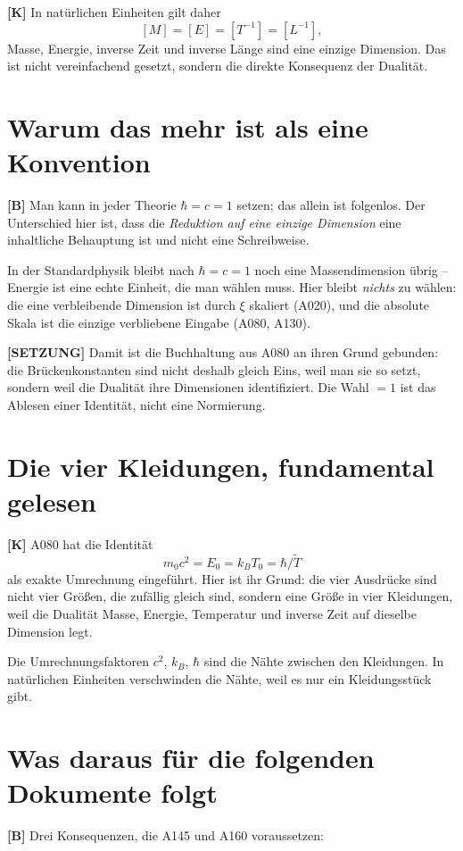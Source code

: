 \textbf{[K]} In natürlichen Einheiten gilt daher
\[
  [M] = [E] = [T^{-1}] = [L^{-1}],
\]
Masse, Energie, inverse Zeit und inverse Länge sind eine einzige Dimension. Das
ist nicht vereinfachend gesetzt, sondern die direkte Konsequenz der Dualität.

\section{Warum das mehr ist als eine Konvention}

\textbf{[B]} Man kann in jeder Theorie $\hbar = c = 1$ setzen; das allein ist
folgenlos. Der Unterschied hier ist, dass die \emph{Reduktion auf eine einzige
Dimension} eine inhaltliche Behauptung ist und nicht eine Schreibweise.

In der Standardphysik bleibt nach $\hbar = c = 1$ noch eine Massendimension
übrig -- Energie ist eine echte Einheit, die man wählen muss. Hier bleibt
\emph{nichts} zu wählen: die eine verbleibende Dimension ist durch $\xi$
skaliert (A020), und die absolute Skala ist die einzige verbliebene Eingabe
(A080, A130).

\textbf{[SETZUNG]} Damit ist die Buchhaltung aus A080 an ihren Grund gebunden:
die Brückenkonstanten sind nicht deshalb gleich Eins, weil man sie so setzt,
sondern weil die Dualität ihre Dimensionen identifiziert. Die Wahl $=1$ ist
das Ablesen einer Identität, nicht eine Normierung.

\section{Die vier Kleidungen, fundamental gelesen}

\textbf{[K]} A080 hat die Identität
\[
  m_0 c^2 = E_0 = k_B T_0 = \hbar/\tilde T
\]
als exakte Umrechnung eingeführt. Hier ist ihr Grund: die vier Ausdrücke sind
nicht vier Größen, die zufällig gleich sind, sondern eine Größe in vier
Kleidungen, weil die Dualität Masse, Energie, Temperatur und inverse Zeit auf
dieselbe Dimension legt.

Die Umrechnungsfaktoren $c^2$, $k_B$, $\hbar$ sind die Nähte zwischen den
Kleidungen. In natürlichen Einheiten verschwinden die Nähte, weil es nur ein
Kleidungsstück gibt.

\section{Was daraus für die folgenden Dokumente folgt}

\textbf{[B]} Drei Konsequenzen, die A145 und A160 voraussetzen:

